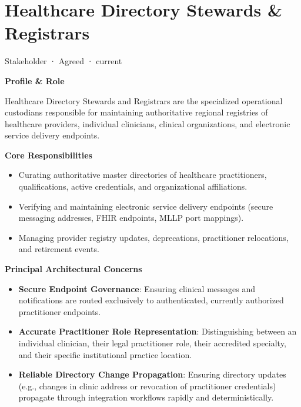 \section{Healthcare Directory Stewards \& Registrars}

\label{element:1c8e2c898a28436693cf2ae69776e125}
{\small Stakeholder · Agreed · current}\par

\par\medskip\textbf{Profile \& Role}\par


Healthcare Directory Stewards and Registrars are the specialized operational custodians responsible for maintaining authoritative regional registries of healthcare providers, individual clinicians, clinical organizations, and electronic service delivery endpoints.



\par\medskip\textbf{Core Responsibilities}\par


\begin{itemize}


\item Curating authoritative master directories of healthcare practitioners, qualifications, active credentials, and organizational affiliations.

\item Verifying and maintaining electronic service delivery endpoints (secure messaging addresses, FHIR endpoints, MLLP port mappings).

\item Managing provider registry updates, deprecations, practitioner relocations, and retirement events.

\end{itemize}


\par\medskip\textbf{Principal Architectural Concerns}\par


\begin{itemize}


\item \textbf{Secure Endpoint Governance}: Ensuring clinical messages and notifications are routed exclusively to authenticated, currently authorized practitioner endpoints.

\item \textbf{Accurate Practitioner Role Representation}: Distinguishing between an individual clinician, their legal practitioner role, their accredited specialty, and their specific institutional practice location.

\item \textbf{Reliable Directory Change Propagation}: Ensuring directory updates (e.g., changes in clinic address or revocation of practitioner credentials) propagate through integration workflows rapidly and deterministically.

\end{itemize}

